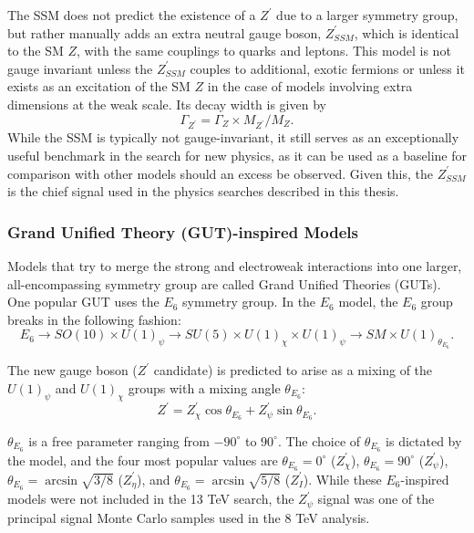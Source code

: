 The SSM does not predict the existence of a $Z^{\prime}$ due to a larger symmetry group, but rather manually adds an extra neutral gauge boson, $Z^{\prime}_{SSM}$, which is identical to the SM $Z$, with the same couplings to quarks and leptons. This model is not gauge invariant unless the $Z^{\prime}_{SSM}$ couples to additional, exotic fermions or unless it exists as an excitation of the SM $Z$ in the case of models involving extra dimensions at the weak scale. Its decay width is given by 
\begin{equation}
\Gamma_{Z^{\prime}} = \Gamma_Z \times M_{Z^{\prime}}/M_{Z}.
\end{equation}
\noindent While the SSM is typically not gauge-invariant, it still serves as an exceptionally useful benchmark in the search for new physics, as it can be used as a baseline for comparison with other models should an excess be observed\cite{SSM}. Given this, the $Z^{\prime}_{SSM}$ is the chief signal used in the physics searches described in this thesis. 

\subsubsection{Grand Unified Theory (GUT)-inspired Models}

Models that try to merge the strong and electroweak interactions into one larger, all-encompassing symmetry group are called Grand Unified Theories (GUTs). One popular GUT uses the $E_6$ symmetry group. In the $E_6$ model, the $E_6$ group breaks in the following fashion:
\begin{equation}
E_6 \to SO(10) \times U(1)_\psi \to SU(5) \times U(1)_\chi \times U(1)_\psi \to SM \times U(1)_{\theta_{E_6}}.
\end{equation}

\noindent The new gauge boson ($Z^\prime$ candidate) is predicted to arise as a mixing of the $U(1)_\psi$ and $U(1)_\chi$ groups with a mixing angle $\theta_{E_6}$:
\begin{equation}
Z^{\prime} = Z^\prime_\chi \cos{\theta_{E_6}} + Z^\prime_\psi \sin{\theta_{E_6}}.
\end{equation}

\noindent$\theta_{E_6}$ is a free parameter ranging from $-90^{\circ}$ to $90^{\circ}$. The choice of $\theta_{E_6}$ is dictated by the model, and the four most popular values are $\theta_{E_6} = 0^{\circ}$ ($Z^\prime_\chi$), $\theta_{E_6} = 90^{\circ}$ ($Z^\prime_\psi$), $\theta_{E_6} = \arcsin{\sqrt{3/8}}$ ($Z^\prime_\eta$), and $\theta_{E_6} = \arcsin{\sqrt{5/8}}$ ($Z^\prime_I$)\cite{E6}. While these $E_6$-inspired models were not included in the 13 TeV search, the $Z^\prime_\psi$ signal was one of the principal signal Monte Carlo samples used in the 8 TeV analysis.